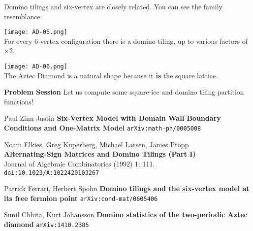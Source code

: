 \documentclass[12pt]{article}
\begin{document}
\noindent Domino tilings and six-vertex are closely related.  You can see the family resemblance.  

\texttt{[image: AD-05.png]} \\

\noindent For every 6-vertex configuration there is a domino tiling, up to various factors of $\times 2$.  

\texttt{[image: AD-06.png]}\\
The Aztec Diamond is a natural shape because it \textbf{is} the square lattice.

\newpage

\selectfont \fontsize{20}{25}\selectfont  

\noindent \textbf{Problem Session} Let us compute some square-ice and domino tiling partition functions! 


\vfill

\selectfont \fontsize{12}{10}\selectfont

\begin{thebibliography}{}

\item Paul Zinn-Justin \textbf{Six-Vertex Model with Domain Wall Boundary Conditions and One-Matrix Model} \texttt{arXiv:math-ph/0005008}

\item Noam Elkies, Greg Kuperberg, Michael Larsen, James Propp \\ \textbf{Alternating-Sign Matrices and Domino Tilings (Part I) }  \\ Journal of Algebraic Combinatorics (1992) 1: 111.  \texttt{doi:10.1023/A:1022420103267}

\item Patrick Ferrari, Herbert Spohn \textbf{Domino tilings and the six-vertex model at its free fermion point} \texttt{arXiv:cond-mat/0605406}

\item Sunil Chhita, Kurt Johansson \textbf{Domino statistics of the two-periodic Aztec diamond} \texttt{arXiv:1410.2385
}

\end{thebibliography} 




\newpage

\selectfont \fontsize{20}{25}\selectfont  
\end{document}
